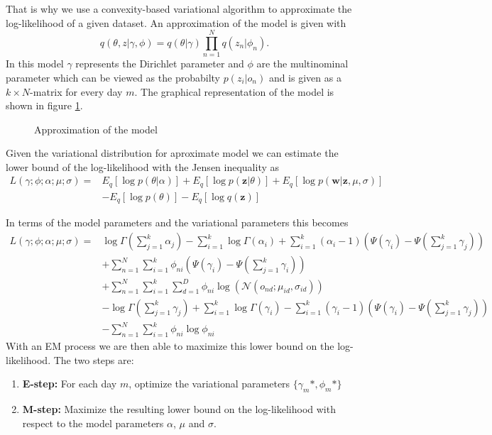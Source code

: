 \documentclass[11pt,a4paper]{article}
\begin{document}
That is why we use a convexity-based variational algorithm to approximate the log-likelihood of a given dataset. 
An approximation of the model is given with 
  \begin{equation}
   q(\theta,z|\gamma,\phi) = q(\theta|\gamma) \prod_{n=1}^N q(z_n|\phi_n).
  \end{equation}
In this model $\gamma$ represents the Dirichlet parameter and $\phi$ are the multinominal parameter which can be viewed as the probabilty $p(z_i|o_n)$ and is given as a $k \times N$-matrix for every day $m$. The graphical representation of the model is shown in figure \ref{fig:ModelApprox}.
  
 
\begin{figure}[h!]
\centering
\def\svgwidth{0.4\textwidth}

\caption{Approximation of the model}
\label{fig:ModelApprox}
\end{figure}
 
  
  
  
  Given the variational distribution for aproximate model we can estimate the lower bound of the log-likelihood with the Jensen inequality as
  \begin{equation}
   \begin{split}
    L(\gamma;\phi;\alpha;\mu;\sigma) =& E_q[\log p(\theta|\alpha)] + E_q[\log p(\textbf{z}|\theta)] + E_q[\log p(\textbf{w}|\textbf{z},\mu,\sigma)] \\
   & -E_q[\log p(\theta)] - E_q[\log q(\textbf{z})]
   \end{split}
  \end{equation}

In terms of the model parameters and the variational parameters this becomes
\begin{equation}
  \begin{split}
 L(\gamma;\phi;\alpha;\mu;\sigma) =& \log \Gamma (\sum_{j=1}^k \alpha_j) - \sum_{i=1}^k \log \Gamma(\alpha_i) + \sum_{i=1}^k (\alpha_i-1)(\Psi(\gamma_i)-\Psi(\sum_{j=1}^k \gamma_j)) \\
 & + \sum_{n=1}^N \sum_{i=1}^k \phi_{ni} (\Psi(\gamma_i)-\Psi(\sum_{j=1}^k \gamma_i)) \\
  & + \sum_{n=1}^N \sum_{i=1}^k \sum_{d=1}^D \phi_{ni} \log( \mathcal{N}(o_{nd};\mu_{id},\sigma_{id})) \\
  & - \log \Gamma (\sum_{j=1}^k \gamma_j) + \sum_{i=1}^k \log \Gamma (\gamma_i) - \sum_{i=1}^k (\gamma_i -1)(\Psi(\gamma_i)-\Psi(\sum_{j=1}^k \gamma_j)) \\
 & - \sum_{n=1}^N \sum_{i=1}^k \phi_{ni} \log \phi_{ni}
  \end{split}
  \label{eq:likeli}
\end{equation}
With an EM process we are then able to maximize this lower bound on the log-likelihood. The two steps are:
  \begin{enumerate}
   \item \textbf{E-step:} For each day $m$, optimize the variational parameters $\{ \gamma_{m}*,\phi_{m}* \}$
   \item \textbf{M-step:} Maximize the resulting lower bound on the log-likelihood with respect to the model parameters $\alpha$, $\mu$ and $\sigma$.
  \end{enumerate}
  
\end{document}

